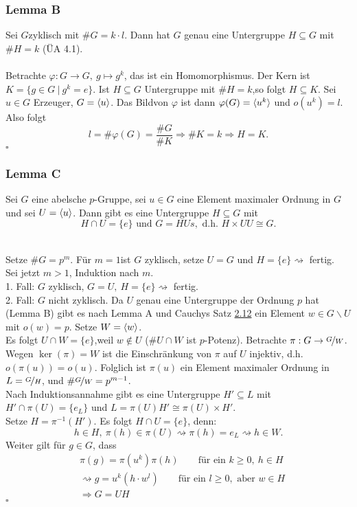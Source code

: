 \subsubsection*{Lemma B}
Sei $G$zyklisch mit $\#G=k\cdot l$. Dann hat $G$ genau eine Untergruppe $H\subseteq G$ mit $\#H=k$ (ÜA 4.1).\\

\\
Betrachte $\varphi:G\to G,~g\mapsto g^k$, das ist ein Homomorphismus. Der Kern ist $K=\{g\in G~|~g^k=e \}$. Ist $H\subseteq G$ Untergruppe mit $\#H=k$,so folgt $H\subseteq K$. Sei $u\in G$ Erzeuger, $G=\langle u \rangle$. Das Bildvon $\varphi$ ist dann $\varphi(G)=\langle u^k \rangle$ und $o(u^k)=l$. Also folgt \[ l=\#\varphi(G)= \frac{\#G}{\#K} \Rightarrow \#K=k \Rightarrow H=K. \]
\hfill $\square$

\subsubsection*{Lemma C}
Sei $G$ eine abelsche $p$-Gruppe, sei $u\in G$ eine Element maximaler Ordnung in $G$ und sei $U=\langle u \rangle$. Dann gibt es eine Untergruppe $H\subseteq G$ mit
\[ H\cap U=\{e\} \text{ und } G=HUs, \text{ d.h. } H\times UU\cong G. \]

\\
Setze $\#G=p^m$. Für $m=1$ist $G$ zyklisch, setze $U=G$ und $H=\{e\} \rightsquigarrow$ fertig.\\
Sei jetzt $m>1$, Induktion nach $m$.\\
1. Fall: $G$ zyklisch, $G=U,~H=\{e\}\rightsquigarrow$ fertig.\\
2. Fall: $G$ nicht zyklisch. Da $U$ genau eine Untergruppe der Ordnung $p$ hat (Lemma B) gibt es nach Lemma A und Cauchys Satz \hyperref[sub:cauchys_satz]{2.12} ein Element $w\in G\backslash U$ mit $o(w)=p$. Setze $W=\langle w \rangle$.\\
Es folgt $U\cap W=\{e\}$,weil $w\notin U$ ($\#U\cap W$ ist $p$-Potenz). Betrachte $\pi:G\to \nicefrac{G}{W}$. Wegen $\ker(\pi)=W$ ist die Einschränkung von $\pi$ auf $U$ injektiv, d.h. $o(\pi(u))=o(u)$. Folglich ist $\pi(u)$ ein Element maximaler Ordnung in $L=\nicefrac{G}{H}$, und $\#\nicefrac{G}{W}=p^{m-1}$.\\

Nach Induktionsannahme gibt es eine Untergruppe $H'\subseteq L$ mit $H'\cap \pi(U)=\{e_L\}$ und $L=\pi(U)H'\cong \pi(U)\times H'$.\\
Setze $H=\pi^{-1}(H')$. Es folgt $H\cap U=\{e\}$, denn:
\[ h\in H,~\pi(h)\in \pi(U)\rightsquigarrow \pi(h)=e_L \rightsquigarrow h\in W. \]
Weiter gilt für $g\in G$, dass 
\begin{equation*}
\begin{aligned}
	&\pi(g)=\pi(u^k)\pi(h)\qquad \text{für ein } k\ge 0,~h\in H\\
	&\rightsquigarrow g=u^k(h\cdot w^l)\qquad\text{für ein } l\ge 0,\text{ aber } w\in H\\
	&\Rightarrow G=UH
\end{aligned}
\end{equation*}
\hfill $\square$

